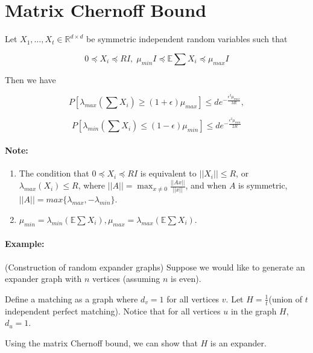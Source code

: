 \documentclass[11pt]{article}
\begin{document}
\section{Matrix Chernoff Bound}

\begin{definition}

Let $X_1, \dots, X_t \in \mathbb{R}^{d \times d}$ be symmetric independent random variables such that

\[
	0 \preceq X_i \preceq RI, \; \mu_{min} I \preceq \mathbb{E}\sum X_i \preceq \mu_{max} I
\]

Then we have

\[
	P[\lambda_{max}(\sum X_i) \ge (1+\epsilon) \mu_{max}] \le d e^{-\frac{\epsilon^2 \mu_{max}}{3R}},
\]

\[
	P[\lambda_{min}(\sum X_i) \le (1-\epsilon) \mu_{min}] \le d e^{-\frac{\epsilon^2 \mu_{min}}{2R}}
\]
	
\end{definition}

\paragraph{Note:}

\begin{enumerate}
	\item The condition that $0 \preceq X_i \preceq RI$ is equivalent to $||X_i|| \le R$, or $\lambda_{max}(X_i) \le R$, where $||A|| = \max_{x \ne 0} \frac{||Ax||}{||x||}$, and when $A$ is symmetric, $||A||=max\{\lambda_{max}, -\lambda_{min}\}$. 
	\item $\mu_{min}=\lambda_{min}(\mathbb{E}\sum X_i), \mu_{max}=\lambda_{max}(\mathbb{E}\sum X_i)$.
\end{enumerate}

\paragraph{Example:}

(Construction of random expander graphs) Suppose we would like to generate an expander graph with $n$ vertices (assuming $n$ is even).

Define a matching as a graph where $d_v=1$ for all vertices $v$. Let $H=\frac{1}{t}$(union of $t$ independent perfect matching). Notice that for all vertices $u$ in the graph $H$, $d_u = 1$. 

Using the matrix Chernoff bound, we can show that $H$ is an expander.\\
\end{document}
